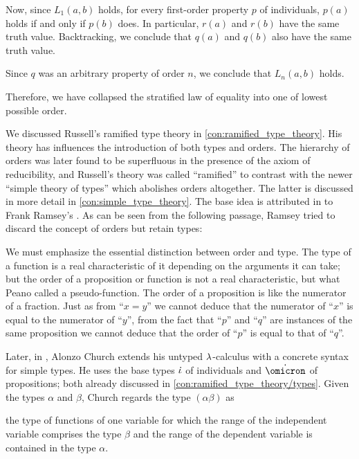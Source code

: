 \begin{concept}
\begin{thmenum}
    Now, since \( L_1(a, b) \) holds, for every first-order property \( p \) of individuals, \( p(a) \) holds if and only if \( p(b) \) does. In particular, \( r(a) \) and \( r(b) \) have the same truth value. Backtracking, we conclude that \( q(a) \) and \( q(b) \) also have the same truth value.

    Since \( q \) was an arbitrary property of order \( n \), we conclude that \( L_n(a, b) \) holds.

    Therefore, we have collapsed the stratified law of equality into one of lowest possible order.
  \end{thmenum}
\end{concept}

\begin{remark}\label{rem:type_theory}
  We discussed Russell's ramified type theory in \cref{con:ramified_type_theory}. His theory has influences the introduction of both types and orders. The hierarchy of orders was later found to be superfluous in the presence of the axiom of reducibility, and Russell's theory was called \enquote{ramified} to contrast with the newer \enquote{simple theory of types} which abolishes orders altogether. The latter is discussed in more detail in \cref{con:simple_type_theory}. The base idea is attributed in \cite[45]{Kleene1971Metamathematics} to Frank Ramsey's \cite{Ramsey1926Foundations}. As can be seen from the following passage, Ramsey tried to discard the concept of orders but retain types:
  \begin{displayquote}
    We must emphasize the essential distinction between order and type. The type of a function is a real characteristic of it depending on the
    arguments it can take; but the order of a proposition or function is not a real characteristic, but what Peano called a pseudo-function. The
    order of a proposition is like the numerator of a fraction. Just as from \enquote{\( x = y \)} we cannot deduce that the numerator of \enquote{\( x \)} is equal to the numerator of \enquote{\( y \)}, from the fact that \enquote{\( p \)} and \enquote{\( q \)} are instances of the
    same proposition we cannot deduce that the order of \enquote{\( p \)} is equal to that of \enquote{\( q \)}.
  \end{displayquote}

  Later, in \cite{Church1940STT}, Alonzo Church extends his untyped \( {\mathrm \lambda} \)-calculus with a concrete syntax for simple types. He uses the base types \( \dot{\iota} \) of individuals and \( \syn\omicron \) of propositions; both already discussed in \cref{con:ramified_type_theory/types}. Given the types \( \alpha \) and \( \beta \), Church regards the type \( (\alpha\beta) \) as
  \begin{displayquote}
    \textellipsis the type of functions of one variable for which the range of the independent variable comprises the type \( \beta \) and the range of the dependent variable is contained in the type \( \alpha \).
  \end{displayquote}


\end{remark}
